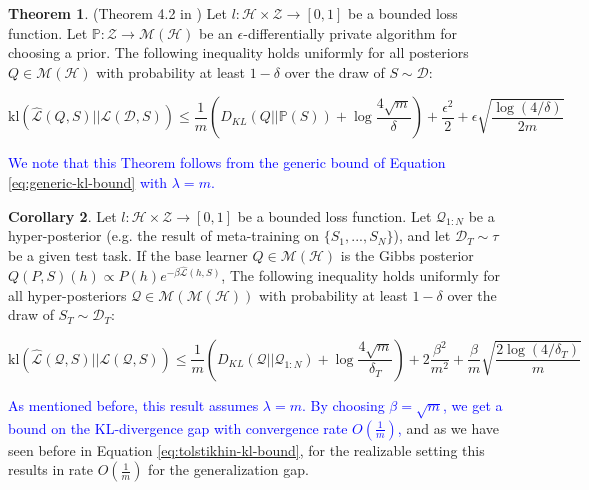 \documentclass{article}
\theoremstyle{definition}
\newtheorem{theorem}{Theorem}[section]
\newtheorem{corollary}[theorem]{Corollary}
\newcommand{\LFe}[1]{\textcolor{blue}{#1}}
\begin{document}
\begin{theorem} (Theorem 4.2 in \citet{Dziugaite2018})
	Let $l:\mathcal{H}\times \mathcal{Z}\rightarrow [0,1]$ be a bounded loss function.
	Let $\mathbb{P}:\mathcal{Z}\rightarrow \mathcal{M}(\mathcal{H})$ be an $\epsilon$-differentially private algorithm for choosing a prior.
	The following inequality holds uniformly for all posteriors $Q\in \mathcal{M}(\mathcal{H})$ with probability at least $1-\delta$ over the draw of $S\sim \mathcal{D}$:
	
	$$\mathrm{kl}(\hat{\mathcal{L}}(Q,S)||\mathcal{L}(\mathcal{D},S))\leq \frac{1}{m}\left (D_{KL}(Q||\mathbb{P}(S))+\log\frac{4\sqrt{m}}{\delta} \right ) +\frac{\epsilon^2}{2}+\epsilon\sqrt{\frac{\log (4/\delta)}{2m}} $$

\end{theorem}

\LFe{We note that this Theorem follows from the generic bound of Equation \ref{eq:generic-kl-bound} with $\lambda=m$.}

\begin{corollary} \label{thm:kl-main-result}
	Let $l:\mathcal{H}\times \mathcal{Z}\rightarrow [0,1]$ be a bounded loss function.
	Let $\mathcal{Q}_{1:N}$ be a hyper-posterior (e.g. the result of meta-training on $\{S_1,...,S_N\}$), and let $\mathcal{D}_T\sim \tau$ be a given test task. 
	If the base learner $Q\in \mathcal{M}(\mathcal{H})$ is the Gibbs posterior $Q(P, S)(h)\propto P(h)e^{-\beta\hat{\mathcal{L}}(h, S)}$, 
	The following inequality holds uniformly for all hyper-posteriors $\mathcal{Q}\in \mathcal{M}(\mathcal{M}(\mathcal{H}))$ with probability at least $1-\delta$ over the draw of $S_T\sim \mathcal{D}_T$:
	
	$$\mathrm{kl}(\hat{\mathcal{L}}(\mathcal{Q},S)||\mathcal{L}(\mathcal{Q},S))\leq \frac{1}{m}\left (D_{KL}(\mathcal{Q}||\mathcal{Q}_{1:N})+\log\frac{4\sqrt{m}}{\delta_T} \right ) +2\frac{\beta^2}{m^2}+\frac{\beta}{m}\sqrt{\frac{2\log (4/\delta_T)}{m}} $$
	
\end{corollary}

\LFe{As mentioned before, this result assumes $\lambda=m$. By choosing $\beta=\sqrt{m}$, we get a bound on the KL-divergence gap with convergence rate $O\left (\frac{1}{m}\right )$, }
and as we have seen before in Equation \ref{eq:tolstikhin-kl-bound}, for the realizable setting this results in rate $O\left (\frac{1}{m}\right )$ for the generalization gap.

\end{document}
